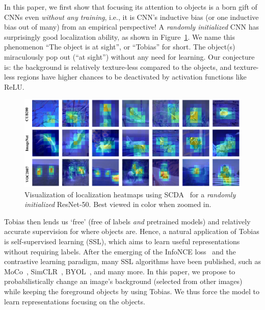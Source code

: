 \documentclass[letterpaper]{article} %
\begin{document}
In this paper, we first show that focusing its attention to objects is a born gift of CNNs even \emph{without any training}, i.e., it is CNN's inductive bias (or one inductive bias out of many) from an empirical perspective! A \textit{randomly initialized} CNN has surprisingly good localization ability, as shown in Figure~\ref{fig:vis}. We name this phenomenon ``The object is at sight'', or ``Tobias'' for short. The object(s) miraculously pop out (``at sight'') without any need for learning. Our conjecture is: the background is relatively texture-less compared to the objects, and texture-less regions have higher chances to be deactivated by activation functions like ReLU.

\begin{figure}[t]
	\centering
	\includegraphics[width=\columnwidth]{visualization}
	\caption{Visualization of localization heatmaps using SCDA~\citep{scda:tip17} for a \textit{randomly initialized} ResNet-50. Best viewed in color when zoomed in.}
	\label{fig:vis}
\end{figure}

Tobias then lends us `free' (free of labels \emph{and} pretrained models) and relatively accurate supervision for where objects are. Hence, a natural application of Tobias is self-supervised learning (SSL), which aims to learn useful representations without requiring labels. After the emerging of the InfoNCE loss~\citep{InfoNCE:arxiv2018} and the contrastive learning paradigm, many SSL algorithms have been published, such as MoCo~\citep{moco:kaiming:CVPR20}, SimCLR~\citep{simclr:hinton:ICML20}, BYOL~\citep{byol:grill:NIPS20}, and many more. In this paper, we propose to probabilistically change an image's background (selected from other images) while keeping the foreground objects by using Tobias. We thus force the model to learn representations focusing on the objects.
\end{document}
